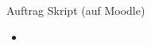 %


\begin{frame}[fragile]{Auftrag}
    Skript (auf Moodle)
    \begin{itemize}
        \item {}
    \end{itemize}
\end{frame}

